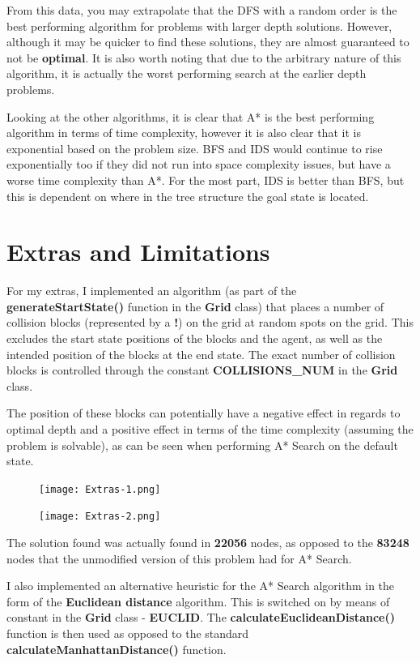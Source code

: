 \documentclass{article}
\begin{document}
	From this data, you may extrapolate that the DFS with a random order is the best performing algorithm for problems with larger depth solutions. However, although it may be quicker to find these solutions, they are almost guaranteed to not be \textbf{optimal}. It is also worth noting that due to the arbitrary nature of this algorithm, it is actually the worst performing search at the earlier depth problems.
	
	Looking at the other algorithms, it is clear that A* is the best performing algorithm in terms of time complexity, however it is also clear that it is exponential based on the problem size. BFS and IDS would continue to rise exponentially too if they did not run into space complexity issues, but have a worse time complexity than A*. For the most part, IDS is better than BFS, but this is dependent on where in the tree structure the goal state is located.
	
	\newpage
	\section{Extras and Limitations}
	For my extras, I implemented an algorithm (as part of the \textbf{generateStartState()} function in the \textbf{Grid} class) that places a number of collision blocks (represented by a \textbf{!}) on the grid at random spots on the grid. This excludes the start state positions of the blocks and the agent, as well as the intended position of the blocks at the end state. The exact number of collision blocks is controlled through the constant \textbf{COLLISIONS\_NUM} in the \textbf{Grid} class.
	
	The position of these blocks can potentially have a negative effect in regards to optimal depth and a positive effect in terms of the time complexity (assuming the problem is solvable), as can be seen when performing A* Search on the default state.
	\begin{figure}[h]	
		\centering
		\texttt{[image: Extras-1.png]}
	\end{figure}

	\begin{figure}[h]
		\centering
		\texttt{[image: Extras-2.png]}
	\end{figure}

	The solution found was actually found in \textbf{22056} nodes, as opposed to the \textbf{83248} nodes that the unmodified version of this problem had for A* Search.
	
	\newpage
	I also implemented an alternative heuristic for the A* Search algorithm in the form of the \textbf{Euclidean distance} algorithm. This is switched on by means of constant in the \textbf{Grid} class - \textbf{EUCLID}. The \textbf{calculateEuclideanDistance()} function is then used as opposed to the standard \textbf{calculateManhattanDistance()} function.
	
\end{document}
